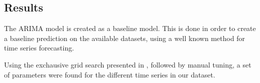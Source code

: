 



\subsection{Results}
The ARIMA model is created as a baseline model.
This is done in order to create a baseline prediction on the available datasets, using a well known method for time series forecasting.

Using the exchausive grid search presented in , followed by manual tuning,
a set of parameters were found for the different time series in our dataset.





